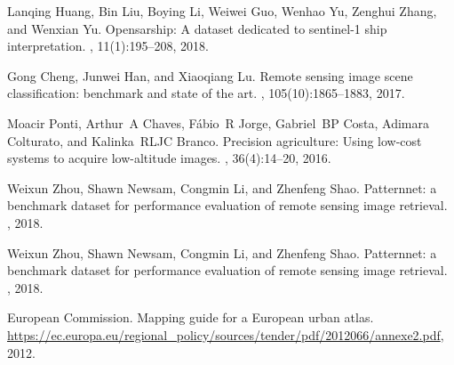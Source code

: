 \documentclass[journal]{IEEEtran}
\begin{document}
\begin{thebibliography}{1}
Lanqing Huang, Bin Liu, Boying Li, Weiwei Guo, Wenhao Yu, Zenghui Zhang, and
  Wenxian Yu.
\newblock Opensarship: A dataset dedicated to sentinel-1 ship interpretation.
, 11(1):195--208, 2018.
  
  
Gong Cheng, Junwei Han, and Xiaoqiang Lu.
\newblock Remote sensing image scene classification: benchmark and state of the
  art.
, 105(10):1865--1883, 2017.

Moacir Ponti, Arthur~A Chaves, F{\'a}bio~R Jorge, Gabriel~BP Costa, Adimara
  Colturato, and Kalinka~RLJC Branco.
\newblock Precision agriculture: Using low-cost systems to acquire low-altitude
  images.
, 36(4):14--20, 2016.

Weixun Zhou, Shawn Newsam, Congmin Li, and Zhenfeng Shao.
\newblock Patternnet: a benchmark dataset for performance evaluation of remote
  sensing image retrieval.
, 2018.


Weixun Zhou, Shawn Newsam, Congmin Li, and Zhenfeng Shao.
\newblock Patternnet: a benchmark dataset for performance evaluation of remote
  sensing image retrieval.
, 2018.

European Commission. Mapping guide for a European urban atlas. \url{https://ec.europa.eu/regional_policy/sources/tender/pdf/2012066/annexe2.pdf}, 2012.




  

\end{thebibliography}

% 
\end{document}
